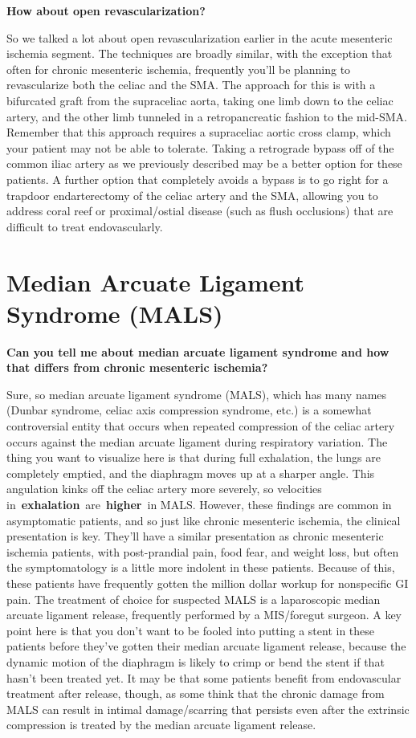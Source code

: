 \documentclass[
]{book}
\begin{document}
\textbf{How about open revascularization?}

So we talked a lot about open revascularization earlier in the acute
mesenteric ischemia segment. The techniques are broadly similar, with
the exception that often for chronic mesenteric ischemia, frequently
you'll be planning to revascularize both the celiac and the SMA. The
approach for this is with a bifurcated graft from the supraceliac aorta,
taking one limb down to the celiac artery, and the other limb tunneled
in a retropancreatic fashion to the mid-SMA. Remember that this approach
requires a supraceliac aortic cross clamp, which your patient may not be
able to tolerate. Taking a retrograde bypass off of the common iliac
artery as we previously described may be a better option for these
patients. A further option that completely avoids a bypass is to go
right for a trapdoor endarterectomy of the celiac artery and the SMA,
allowing you to address coral reef or proximal/ostial disease (such as
flush occlusions) that are difficult to treat endovascularly.~

\hypertarget{median-arcuate-ligament-syndrome-mals}{%
\section{Median Arcuate Ligament Syndrome (MALS)}\label{median-arcuate-ligament-syndrome-mals}}

\textbf{Can you tell me about median arcuate ligament syndrome and how that
differs from chronic mesenteric ischemia?}

Sure, so median arcuate ligament syndrome (MALS), which has many names
(Dunbar syndrome, celiac axis compression syndrome, etc.) is a somewhat
controversial entity that occurs when repeated compression of the celiac
artery occurs against the median arcuate ligament during respiratory
variation. The thing you want to visualize here is that during full
exhalation, the lungs are completely emptied, and the diaphragm moves up
at a sharper angle. This angulation kinks off the celiac artery more
severely, so velocities in~\textbf{exhalation}~are~\textbf{higher}~in MALS.
However, these findings are common in asymptomatic patients, and so just
like chronic mesenteric ischemia, the clinical presentation is key.
They'll have a similar presentation as chronic mesenteric ischemia
patients, with post-prandial pain, food fear, and weight loss, but often
the symptomatology is a little more indolent in these patients. Because
of this, these patients have frequently gotten the million dollar workup
for nonspecific GI pain. The treatment of choice for suspected MALS is a
laparoscopic median arcuate ligament release, frequently performed by a
MIS/foregut surgeon. A key point here is that you don't want to be
fooled into putting a stent in these patients before they've gotten
their median arcuate ligament release, because the dynamic motion of the
diaphragm is likely to crimp or bend the stent if that hasn't been
treated yet. It may be that some patients benefit from endovascular
treatment after release, though, as some think that the chronic damage
from MALS can result in intimal damage/scarring that persists even after
the extrinsic compression is treated by the median arcuate ligament
release.
\end{document}
